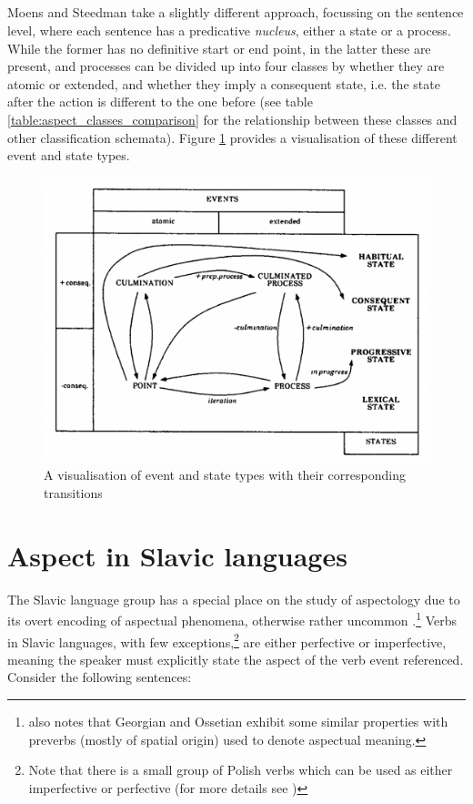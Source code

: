 \subsection*{\citet{moens-steedman-1988-temporal}}
Moens and Steedman take a slightly different approach, focussing on the sentence level, where each sentence has a predicative \emph{nucleus}, either a state or a process. While the former has no definitive start or end point, in the latter these are present, and processes can be divided up into four classes by whether they are atomic or extended, and whether they imply a consequent state, i.e. the state after the action is different to the one before (see table \ref{table:aspect_classes_comparison} for the relationship between these classes and other classification schemata). Figure \ref{fig:moens_steedman_figure} provides a visualisation of these different event and state types.

\begin{figure}[h]
    \includegraphics[width=\textwidth]{img/moens_steedman_figure.png}
    \caption[\citep{moens-steedman-1988-temporal} event types]{A visualisation of event and state types with their corresponding transitions \citep{moens-steedman-1988-temporal}}
    \label{fig:moens_steedman_figure}
\end{figure}

\section{Aspect in Slavic languages}
\label{sec:asp_in_slav_lang}
The Slavic language group has a special place on the study of aspectology due to its overt encoding of aspectual phenomena, otherwise rather uncommon \citep{slavstyleaspect}.\footnote{\citet{slavstyleaspect} also notes that Georgian and Ossetian exhibit some similar properties with preverbs (mostly of spatial origin) used to denote aspectual meaning.} Verbs in Slavic languages, with few exceptions,\footnote{Note that there is a small group of Polish verbs which can be used as either imperfective or perfective (for more details see \citet{kipka1990slavic})} are either perfective or imperfective, meaning the speaker must explicitly state the aspect of the verb event referenced. Consider the following sentences:

